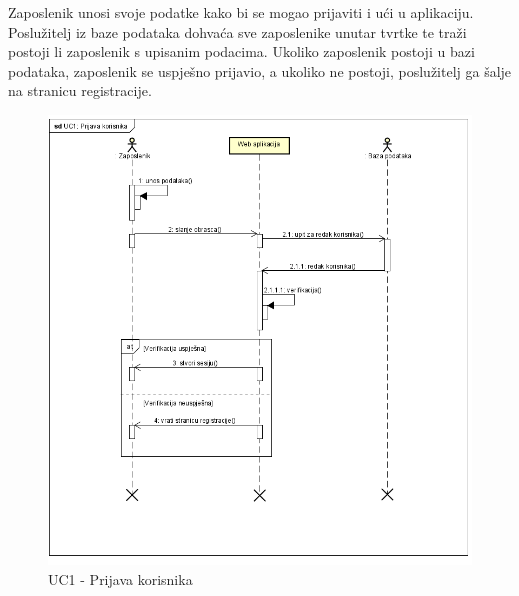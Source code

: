 				
				Zaposlenik unosi svoje podatke kako bi se mogao prijaviti i ući u aplikaciju. Poslužitelj iz baze podataka dohvaća sve zaposlenike unutar tvrtke te traži postoji li zaposlenik s upisanim podacima. Ukoliko zaposlenik postoji u bazi podataka, zaposlenik se uspješno prijavio, a ukoliko ne postoji, poslužitelj ga šalje na stranicu registracije.
				\begin{figure}[H]
					\includegraphics[scale=0.7]{slike/UC1 - Prijava korisnika.png} %
					\centering
					\caption{UC1 - Prijava korisnika}
					\label{uc1}
				\end{figure}
			
